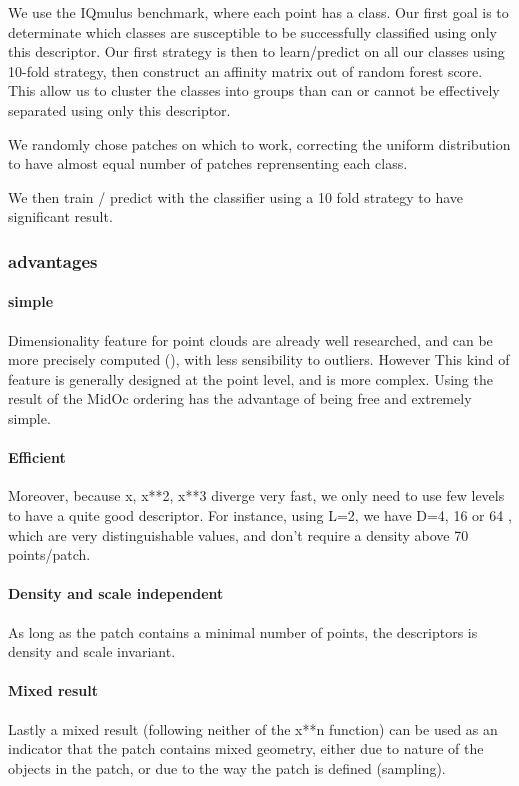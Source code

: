 			We use the IQmulus benchmark, where each point has a class.
			Our first goal is to determinate which classes are susceptible to be successfully classified using only this descriptor.
			Our first strategy is then to learn/predict on all our classes using 10-fold strategy, then construct an affinity matrix out of random forest score.
			This allow us to cluster the classes into groups than can or cannot be effectively separated using only this descriptor.
			
			We randomly chose patches on which to work, correcting the uniform distribution to have almost equal number of patches reprensenting each class.
			
			We then train / predict with the classifier using a 10 fold strategy to have significant result.
			 
			
		\subsubsection{advantages}
			\paragraph{simple}
				Dimensionality feature for point clouds are already well researched, and can be more precisely computed (\cite{Demantke2014}), with less sensibility to outliers. However This kind of feature is generally designed at the point level, and is more complex.
				Using the result of the MidOc ordering has the advantage of being free and extremely simple. 
			\paragraph{Efficient}
				Moreover, because x, x**2, x**3 diverge very fast, we only need to use few levels to have a quite good descriptor. For instance, using L=2, we have D=4, 16 or 64 , which are very distinguishable values, and don't require a density above 70 points/patch. 
			\paragraph{Density and scale independent}
				As long as the patch contains a minimal number of points, the descriptors is density and scale invariant.
			\paragraph{Mixed result}
				Lastly a mixed result (following neither of the x**n function) can be used as an indicator that the patch contains mixed geometry, either due to nature of the objects in the patch, or due to the way the patch is defined (sampling).
				
			
			
		
		
		
